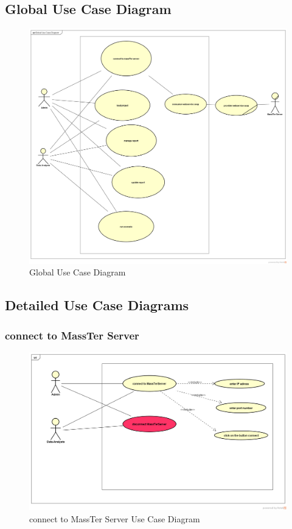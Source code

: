 \documentclass[12pt]{article}
\begin{document}
	\subsection{Global Use Case Diagram}
	\clearpage
	\newpage
	\begin{figure}[h]
		\centering
		\includegraphics[width=1.0\textwidth]{GlobalUseCaseDiagram.png}
		\caption{Global Use Case Diagram}
		
	\end{figure}

\clearpage
\newpage


	\subsection{Detailed Use Case Diagrams}
	\clearpage
	\newpage
	 \subsubsection{connect to MassTer Server}
	 	\begin{figure}[h]
	 	\centering
	 	\includegraphics[width=1.0\textwidth]{connectToMassTerServer.png}
	 	\caption{connect to MassTer Server Use Case Diagram}
	 	
	 \end{figure}
 \clearpage
 \newpage
\end{document}
